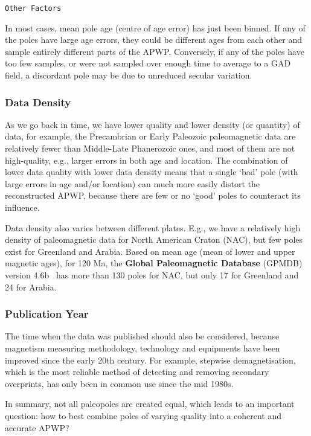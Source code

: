 \verb"Other Factors"

In most cases, mean pole age (centre of age error) has just been binned. If
any of the poles have large age errors, they could be different ages from each
other and sample entirely different parts of the APWP\@. Conversely, if any of
the poles have too few samples, or were not sampled over enough time to average
to a GAD field, a discordant pole may be due to unreduced secular variation.

\subsubsection{Data Density}

As we go back in time, we have lower quality and lower density (or quantity) of
data, for example, the Precambrian or Early Paleozoic paleomagnetic data are
relatively fewer than Middle-Late Phanerozoic ones, and most of them are not
high-quality, e.g., larger errors in both age and location. The combination of
lower data quality with lower data density means that a single `bad' pole (with
large errors in age and/or location) can much more easily distort the
reconstructed APWP, because there are few or no `good' poles to counteract its
influence.

Data density also varies between different plates. E.g., we have a relatively
high density of paleomagnetic data for North American Craton (NAC), but few
poles exist for Greenland and Arabia. Based on mean age (mean of lower and upper
magnetic ages), for 120 Ma, the \textbf{Global Paleomagnetic
Database} (GPMDB) version 4.6b~\cite[updated in 2016 by the Ivar Giaever
Geomagnetic Laboratory team, in collaboration with Pisarevsky]{M96,P05} has more
than 130 poles for NAC, but only 17 for Greenland and 24 for Arabia.

\subsubsection{Publication Year}

The time when the data was published should also be considered, because
magnetism measuring methodology, technology and equipments have been improved
since the early 20th century. For example, stepwise demagnetisation, which is
the most reliable method of detecting and removing secondary overprints, has
only been in common use since the mid 1980s.

In summary, not all paleopoles are created equal, which leads to an important
question: how to best combine poles of varying quality into a coherent and
accurate APWP\@?

